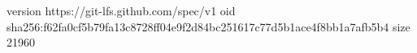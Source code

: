 version https://git-lfs.github.com/spec/v1
oid sha256:f62fa0cf5b79fa13c8728ff04e9f2d84bc251617c77d5b1ace4f8bb1a7afb5b4
size 21960
